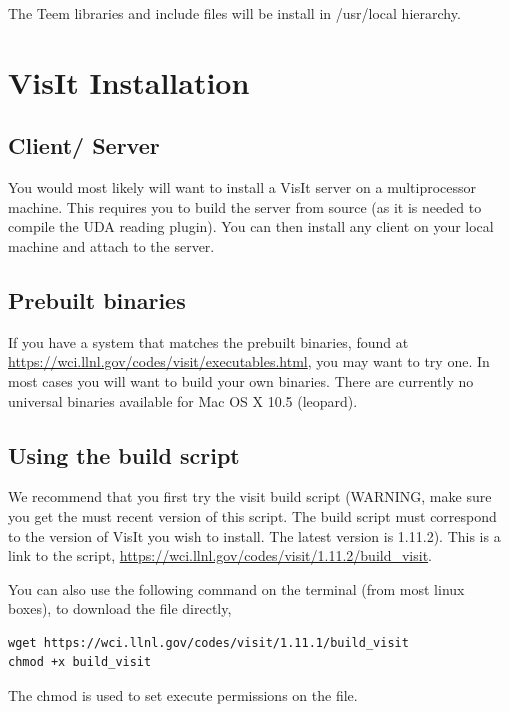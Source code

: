 \documentclass[12pt]{article}
\begin{document}
The Teem libraries and include files will be install in /usr/local hierarchy.

\section{VisIt Installation}

\subsection{Client/ Server}
\label{sec:ClientServer}

You would most likely will want to install a VisIt server on a multiprocessor machine. This requires you to build the server from source (as it is needed to compile the UDA reading plugin). You can then install any client on your local machine and attach to the server. 

\subsection{Prebuilt binaries}
\label{sec:PrebuiltBinaries}

If you have a system that matches the prebuilt binaries, found at \url{https://wci.llnl.gov/codes/visit/executables.html}, you may want to try one. In most cases you will want to build your own binaries. There are currently no universal binaries available for Mac OS X 10.5 (leopard).

\subsection{Using the build script}
\label{sec:UsingTheBuildScript}

We recommend that you first try the visit build script (WARNING, make sure you get the must recent version of this script. The build script must correspond to the version of VisIt you wish to install. The latest version is 1.11.2). This is a link to the script, \url{https://wci.llnl.gov/codes/visit/1.11.2/build\_visit}.

You can also use the following command on the terminal (from most linux boxes), to download the file directly, 

\begin{Verbatim}[fontsize=\footnotesize]
wget https://wci.llnl.gov/codes/visit/1.11.1/build_visit
chmod +x build_visit
\end{Verbatim}

\normalfont The chmod is used to set execute permissions on the file.
\end{document}
